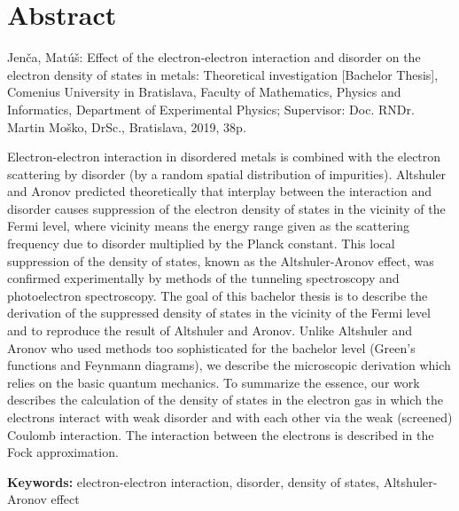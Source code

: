 \thispagestyle{empty}
\section*{Abstract}

Jenča, Matúš: Effect of the electron-electron interaction and disorder on the electron density of states in metals: Theoretical investigation [Bachelor
Thesis], Comenius University in Bratislava, Faculty of Mathematics, Physics and Informatics, Department of Experimental Physics; Supervisor: Doc. RNDr. Martin Moško, DrSc., Bratislava, 2019, 38p.

Electron-electron interaction in disordered metals is combined with the electron scattering by disorder (by a random spatial distribution of impurities). Altshuler and Aronov predicted theoretically that interplay between the interaction and disorder causes
suppression of the electron density of states in the vicinity of the Fermi level, where vicinity means the energy range
given as the scattering frequency due to disorder multiplied by the Planck constant. This local suppression of the density of states, known as the Altshuler-Aronov effect, was confirmed experimentally by methods of the tunneling spectroscopy and photoelectron spectroscopy. 
The goal of this bachelor thesis is to describe the derivation of the suppressed density of states in the vicinity of the Fermi level and to reproduce the result of Altshuler and Aronov.
Unlike Altshuler and Aronov who used methods too sophisticated for the bachelor level (Green's functions and Feynmann diagrams), we describe the microscopic derivation which relies on the basic quantum mechanics.
To summarize the essence, our work describes the calculation of the density of states in the electron gas in which the electrons interact with weak disorder and with each other via the weak (screened) Coulomb interaction.
The interaction between the electrons is described in the Fock approximation.

\begin{flushleft}
  \textbf{Keywords:} electron-electron interaction, disorder, density of states, Altshuler-Aronov effect
\end{flushleft} 